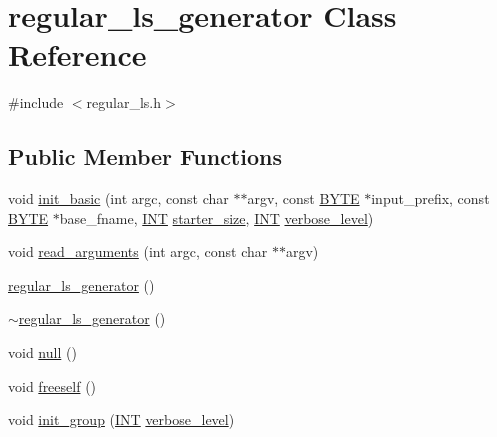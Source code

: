 \hypertarget{classregular__ls__generator}{}\section{regular\+\_\+ls\+\_\+generator Class Reference}
\label{classregular__ls__generator}


{\ttfamily \#include $<$regular\+\_\+ls.\+h$>$}

\subsection*{Public Member Functions}
\begin{DoxyCompactItemize}
\item 
void \mbox{\hyperlink{classregular__ls__generator_a2524357da0ab4acaa6cac1f128ad7992}{init\+\_\+basic}} (int argc, const char $\ast$$\ast$argv, const \mbox{\hyperlink{galois_8h_ab6cc7b4aeb6ea31aba2b3fbfc83ff5e6}{B\+Y\+TE}} $\ast$input\+\_\+prefix, const \mbox{\hyperlink{galois_8h_ab6cc7b4aeb6ea31aba2b3fbfc83ff5e6}{B\+Y\+TE}} $\ast$base\+\_\+fname, \mbox{\hyperlink{galois_8h_a09fddde158a3a20bd2dcadb609de11dc}{I\+NT}} \mbox{\hyperlink{classregular__ls__generator_af90ca8c8cc46427e1cae8c44f967c847}{starter\+\_\+size}}, \mbox{\hyperlink{galois_8h_a09fddde158a3a20bd2dcadb609de11dc}{I\+NT}} \mbox{\hyperlink{simeon_8_c_a818073fbcc2f439e7c56952f67386122}{verbose\+\_\+level}})
\item 
void \mbox{\hyperlink{classregular__ls__generator_a34ea8e77554ca5fdde71d28e1d78a4e5}{read\+\_\+arguments}} (int argc, const char $\ast$$\ast$argv)
\item 
\mbox{\hyperlink{classregular__ls__generator_a8463dab676426e77dfef3718d3de389d}{regular\+\_\+ls\+\_\+generator}} ()
\item 
\mbox{\hyperlink{classregular__ls__generator_a60eb6fcbda75c2882bf5625ebbfdf965}{$\sim$regular\+\_\+ls\+\_\+generator}} ()
\item 
void \mbox{\hyperlink{classregular__ls__generator_affba5c26b9354a220b8be161cb1da5b4}{null}} ()
\item 
void \mbox{\hyperlink{classregular__ls__generator_afb4921511c596c2fc97e981217701be4}{freeself}} ()
\item 
void \mbox{\hyperlink{classregular__ls__generator_a6fabc31cfdaa11bccf11d4076265fe51}{init\+\_\+group}} (\mbox{\hyperlink{galois_8h_a09fddde158a3a20bd2dcadb609de11dc}{I\+NT}} \mbox{\hyperlink{simeon_8_c_a818073fbcc2f439e7c56952f67386122}{verbose\+\_\+level}})

\end{DoxyCompactItemize}
